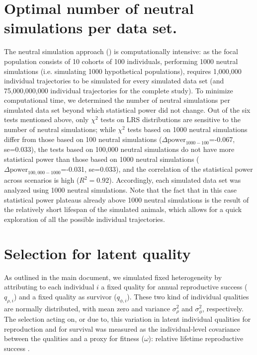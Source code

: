 \section{Optimal number of neutral simulations per data set.}\label{ap:opnum}
The neutral simulation approach (\NSM) is computationally intensive: as the focal population consists of 10 cohorts of 100 individuals, performing 1000 neutral simulations (i.e. simulating 1000 hypothetical populations), requires 1,000,000 individual trajectories to be simulated for every simulated data set (and 75,000,000,000 individual trajectories for the complete study). To minimize computational time, we determined the number of neutral simulations per simulated data set beyond which statistical power did not change. Out of the six tests mentioned above, only $\chi^2$ tests on LRS distributions are sensitive to the number of neutral simulations; while $\chi^2$ tests based on 1000 neutral simulations differ from those based on 100 neutral simulations ($\Delta \mathrm{power}_{1000-100}$=-0.067, se=0.033), the tests based on 100,000 neutral simulations do not have more statistical power than those based on 1000 neutral simulations ($\Delta \mathrm{power}_{100,000-1000}$=-0.031, se=0.033), and the correlation of the statistical power across scenarios is high ($R^2=0.92$).
Accordingly, each simulated data set was analyzed using 1000 neutral simulations. Note that the fact that in this case statistical power plateaus already above 1000 neutral simulations is the result of the relatively short lifespan of the simulated animals, which allows for a quick exploration of all the possible individual trajectories. 

\section{Selection for latent quality}\label{ap:sel}

As outlined in the main document, we simulated fixed heterogeneity by attributing to each individual $i$ a fixed quality for annual reproductive success ($q_{\rho, i}$) and a fixed quality as survivor ($q_{\phi,i}$). These two kind of individual qualities are normally distributed, with mean zero and variance $\sigma_{\rho}^2$ and $\sigma_{\phi}^2$, respectively. The selection acting on, or due to, this variation in latent individual qualities for reproduction and for survival was measured as the individual-level covariance between the qualities and a proxy for fitness ($\omega$): relative lifetime reproductive success \parencite{Robertson1966}.

